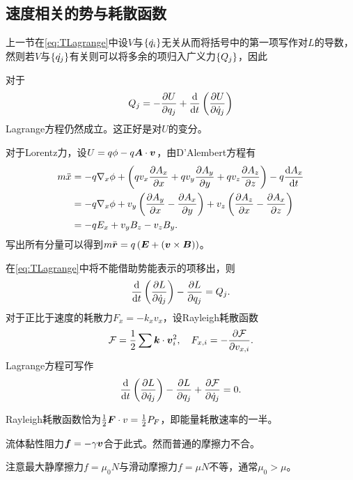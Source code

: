 \documentclass{ctexrep}
\begin{document}
\subsection{速度相关的势与耗散函数}
上一节在\eqref{eq:TLagrange}中设$V$与$\left\{\dot{q_i}\right\}$无关从而将括号中的第一项写作对$L$的导数，然则若$V$与$\left\{\dot{q_j}\right\}$有关则可以将多余的项归入广义力$\left\{Q_j\right\}$，因此
\begin{theorem}
  \label{thm:Uofv}
  对于
  \[ Q_j = -\frac{\partial U}{\partial q_j}+\frac{\mathrm{d}}{\mathrm{d} t}\left(\frac{\partial U}{\partial \dot{q}_j}\right) \]
  Lagrange方程仍然成立。这正好是对$U$的变分。
\end{theorem}
\begin{ex}
  对于Lorentz力，设$U=q\phi-q\boldsymbol{A}\cdot \boldsymbol{v}$，由D'Alembert方程有
  \begin{align*}
    m\ddot{x} &= -q\nabla_x \phi +\left(qv_x\frac{\partial A_x}{\partial x} + qv_y\frac{\partial A_y}{\partial y} + qv_z\frac{\partial A_z}{\partial z}\right) - q \frac{\mathrm{d} A_x}{\mathrm{d} t} \\
    &= -q\nabla_x \phi + v_y\left(\frac{\partial A_y}{\partial x}-\frac{\partial A_x}{\partial y}\right) + v_z\left(\frac{\partial A_z}{\partial x}-\frac{\partial A_x}{\partial z}\right) \\
    &= -qE_x + v_y B_z - v_z B_y.
  \end{align*}
  写出所有分量可以得到$m\ddot{\boldsymbol{r}} = q\left(\boldsymbol{E} + \left(\boldsymbol{v}\times\boldsymbol{B}\right)\right)$。
\end{ex}
在\eqref{eq:TLagrange}中将不能借助势能表示的项移出，则
\[ \frac{\mathrm{d}}{\mathrm{d} t}\left(\frac{\partial L}{\partial \dot{q}_j}\right)-\frac{\partial L}{\partial q_j}=Q_j. \]
对于正比于速度的耗散力$F_{x}=-k_xv_x$，设Rayleigh耗散函数
\[ \mathcal{F} = \frac{1}{2}\sum\boldsymbol{k}\cdot\boldsymbol{v}_i^2, \quad F_{x,i} = -\frac{\partial \mathcal{F}}{\partial v_{x,i}}. \]
Lagrange方程可写作
\begin{equation}
  \label{eq:Lwithdissipation}
  \frac{\mathrm{d}}{\mathrm{d} t}\left(\frac{\partial L}{\partial \dot{q}_j}\right)-\frac{\partial L}{\partial q_j}+\frac{\partial \mathcal{F}}{\partial \dot{q}_j}=0.
\end{equation}
\begin{remark}
  \label{rm:dissipation}
  Rayleigh耗散函数恰为$\frac{1}{2} \boldsymbol{F}\cdot v=\frac{1}{2} P_F$，即能量耗散速率的一半。
\end{remark}
\begin{ex}
  流体黏性阻力$\boldsymbol{f} = -\gamma \boldsymbol{v}$合于此式。然而普通的摩擦力不合。
\end{ex}
注意最大静摩擦力$f=\mu_0 N$与滑动摩擦力$f=\mu N$不等，通常$\mu_0 > \mu$。
\end{document}
